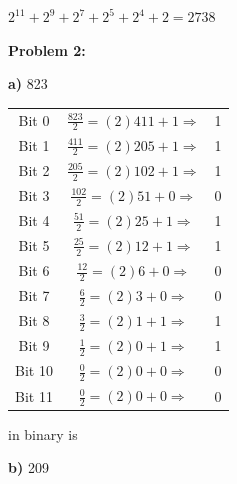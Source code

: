 \documentclass{article}
\begin{document}
    \quad\quad $2^{11} + 2^9 + 2^7 + 2^5 + 2^4 + 2 = \boxed{2738}$

    \textbf{Problem 2:}

    \quad \textbf{a)} 823

    \begin{center}
        \begin{tabular}{ c|c c }
            Bit 0 & $\frac{823}{2} = (2)411 + 1 \Rightarrow$ & 1 \\
            Bit 1 & $\frac{411}{2} = (2)205 + 1 \Rightarrow$ & 1 \\
            Bit 2 & $\frac{205}{2} = (2)102 + 1 \Rightarrow$ & 1 \\
            Bit 3 & $\frac{102}{2} = (2)51 + 0 \Rightarrow$ & 0 \\
            Bit 4 & $\frac{51}{2} = (2)25 + 1 \Rightarrow$ & 1 \\
            Bit 5 & $\frac{25}{2} = (2)12 + 1 \Rightarrow$ & 1 \\
            Bit 6 & $\frac{12}{2} = (2)6 + 0 \Rightarrow$ & 0 \\
            Bit 7 & $\frac{6}{2} = (2)3 + 0 \Rightarrow$ & 0 \\
            Bit 8 & $\frac{3}{2} = (2)1 + 1 \Rightarrow$ & 1 \\
            Bit 9 & $\frac{1}{2} = (2)0 + 1 \Rightarrow$ & 1 \\
            Bit 10 & $\frac{0}{2} = (2)0 + 0 \Rightarrow$ & 0 \\
            Bit 11 & $\frac{0}{2} = (2)0 + 0 \Rightarrow$ & 0
        \end{tabular}
    \end{center}

    \quad{} in binary is 

    \quad \textbf{b)} 209
\end{document}
